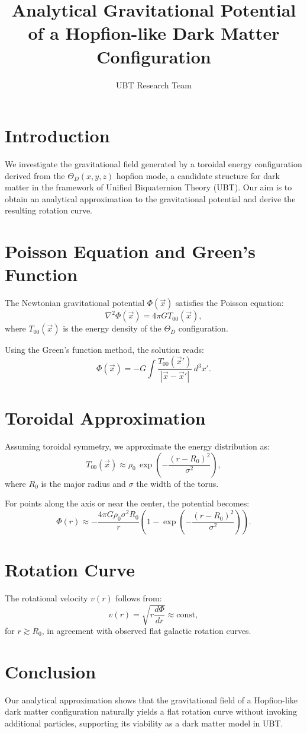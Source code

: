 \documentclass[12pt]{article}
\title{Analytical Gravitational Potential of a Hopfion-like Dark Matter Configuration}
\author{UBT Research Team}
\date{}
\begin{document}
\maketitle

\section*{Introduction}

We investigate the gravitational field generated by a toroidal energy configuration derived from the $\Theta_D(x, y, z)$ hopfion mode, a candidate structure for dark matter in the framework of Unified Biquaternion Theory (UBT). Our aim is to obtain an analytical approximation to the gravitational potential and derive the resulting rotation curve.

\section*{Poisson Equation and Green's Function}

The Newtonian gravitational potential $\Phi(\vec{x})$ satisfies the Poisson equation:
\[
\nabla^2 \Phi(\vec{x}) = 4\pi G T_{00}(\vec{x}),
\]
where $T_{00}(\vec{x})$ is the energy density of the $\Theta_D$ configuration.

Using the Green's function method, the solution reads:
\[
\Phi(\vec{x}) = -G \int \frac{T_{00}(\vec{x}')}{|\vec{x} - \vec{x}'|} \, d^3x'.
\]

\section*{Toroidal Approximation}

Assuming toroidal symmetry, we approximate the energy distribution as:
\[
T_{00}(\vec{x}) \approx \rho_0 \, \exp\left(- \frac{(r - R_0)^2}{\sigma^2} \right),
\]
where $R_0$ is the major radius and $\sigma$ the width of the torus.

For points along the axis or near the center, the potential becomes:
\[
\Phi(r) \approx -\frac{4\pi G \rho_0 \sigma^2 R_0}{r} \left(1 - \exp\left(-\frac{(r - R_0)^2}{\sigma^2}\right)\right).
\]

\section*{Rotation Curve}

The rotational velocity $v(r)$ follows from:
\[
v(r) = \sqrt{r \frac{d\Phi}{dr}} \approx \text{const},
\]
for $r \gtrsim R_0$, in agreement with observed flat galactic rotation curves.

\section*{Conclusion}

Our analytical approximation shows that the gravitational field of a Hopfion-like dark matter configuration naturally yields a flat rotation curve without invoking additional particles, supporting its viability as a dark matter model in UBT.
\end{document}
